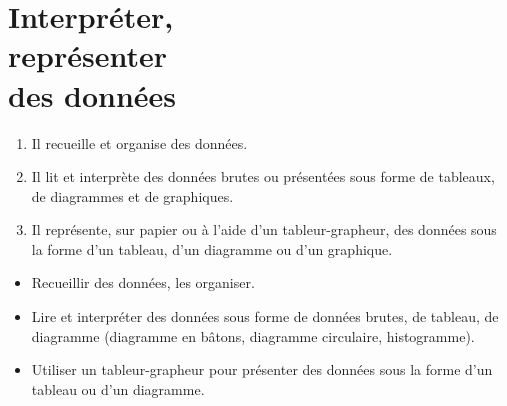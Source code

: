 \themaD
\graphicspath{{../../S06_Interpreter_representer_des_donnees/Images/}}

\newcommand{\Cell}[1]{\fcolorbox[gray]{0.1}{0.9}{\begin{minipage}{2.5cm} #1 \end{minipage}}}
\newcommand{\cell}[1]{\fcolorbox[gray]{0.1}{0.9}{#1}}


\chapter{Interpréter,\\représenter\\des données}
\label{S06}

\begin{autoeval}
   \small
   \begin{enumerate}
      \item Il recueille et organise des données.
      \item Il lit et interprète des données brutes ou présentées sous forme de tableaux, de diagrammes et de graphiques.
      \item Il représente, sur papier ou à l’aide d’un tableur-grapheur, des données sous la forme d’un tableau, d’un diagramme ou d’un graphique.
   \end{enumerate}
\end{autoeval}

\begin{prerequis}
   \begin{itemize}
      \item[\com] Recueillir des données, les organiser.
      \item[\com] Lire et interpréter des données sous forme de données brutes, de tableau, de diagramme (diagramme en bâtons, diagramme circulaire, histogramme).
      \item[\com] Utiliser un tableur-grapheur pour présenter des données sous la forme d’un tableau ou d’un diagramme.
   \end{itemize}
\end{prerequis}

\vfill


